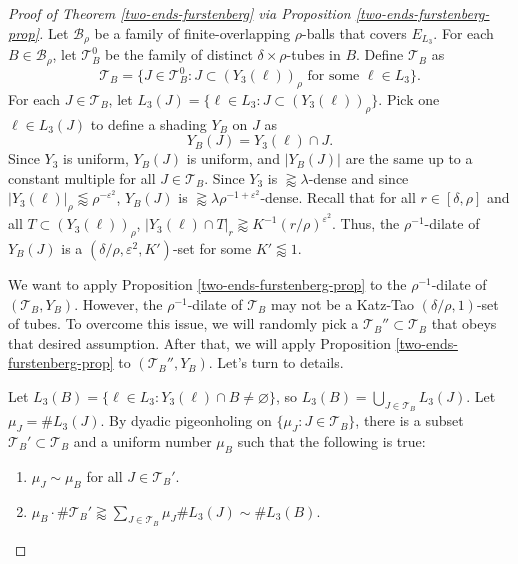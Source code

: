 \documentclass{amsart}
\numberwithin{equation}{section}
\newcommand{\de}{\delta}
\newcommand{\e}{\varepsilon}
\newcommand{\la}{\lambda}
\newcommand{\cb}{\mathcal B}
\newcommand{\cT}{{\mathcal T}}
\begin{document}
\begin{proof}[Proof of Theorem \ref{two-ends-furstenberg} via Proposition \ref{two-ends-furstenberg-prop}]
\smallskip

Let $\cb_\rho$ be a family of finite-overlapping $\rho$-balls that covers $E_{L_3}$.
For each $B\in\cb_\rho$, let $\cT_B^0$ be the family of distinct $\de\times\rho$-tubes in $B$. 
Define $\cT_B$ as 
\begin{equation}
    \cT_B=\{J\in\cT_B^0:J\subset (Y_3(\ell))_\rho \text{ for some $\ell\in L_3$} \}.
\end{equation}
For each $J\in\cT_B$, let $L_3(J)=\{\ell\in L_3:J\subset(Y_3(\ell))_\rho \}$.
Pick one $\ell\in L_3(J)$ to define a shading $Y_B$ on $J$ as
\begin{equation}
    Y_B(J)=Y_3(\ell)\cap J.
\end{equation}
Since $Y_3$ is uniform, $Y_B(J)$ is uniform, and $|Y_B(J)|$ are the same up to a constant multiple for all $J\in\cT_B$.
Since $Y_3$ is $\gtrapprox\la$-dense and since $|Y_3(\ell)|_\rho  \lessapprox \rho^{-\e^2} $,  $Y_B(J)$ is $\gtrapprox\la  \rho^{-1 +\e^2}$-dense.
Recall that for all $r\in[\de,\rho]$ and all $T\subset (Y_3(\ell))_{\rho}$, $|Y_3(\ell)\cap T|_r\gtrapprox K^{-1}(r/\rho)^{\e^2}$.
Thus, the $\rho^{-1}$-dilate of $Y_B(J)$ is a $(\de/\rho,\e^2, K')$-set for some $K'\lessapprox1$.


\smallskip

We want to apply Proposition \ref{two-ends-furstenberg-prop} to the $\rho^{-1}$-dilate of $(\cT_B,Y_B)$. 
However,  the $\rho^{-1}$-dilate of $\cT_B$ may not be a Katz-Tao $(\de/\rho,1)$-set of tubes.
To overcome this issue, we will randomly pick a $\cT_B''\subset\cT_B$ that obeys that desired assumption.
After that, we will apply Proposition \ref{two-ends-furstenberg-prop} to $(\cT_B'',Y_B)$. Let's turn to details. 

\smallskip

 
Let $L_3(B)=\{\ell\in L_3: Y_3(\ell)\cap B\not=\varnothing\}$, so $L_3(B)=\bigcup_{J\in\cT_B}L_3(J)$.
Let $\mu_J=\#L_3(J)$.
By dyadic pigeonholing on $\{\mu_J:J\in\cT_B\}$, there is a subset $\cT_B'\subset\cT_B$ and a uniform number $\mu_B$ such that the following is true:
\begin{enumerate}
    \item $\mu_J\sim\mu_B$ for all $J\in\cT_B'$.
    \item $\mu_B\cdot \#\cT_B'\gtrapprox\sum_{J\in\cT_B}\mu_J\#L_3(J)\sim \#L_3(B)$.
\end{enumerate}


\end{proof}
\end{document}
